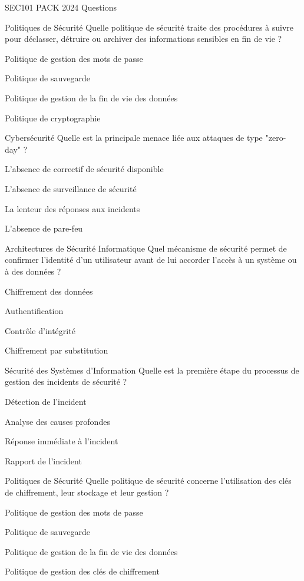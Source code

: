 \documentclass[12pt]{article}
\begin{document}
\begin{quiz}{SEC101 PACK 2024 Questions}
  \begin{multi}[points=1]{Politiques de Sécurité}
    Quelle politique de sécurité traite des procédures à suivre pour déclasser, détruire ou archiver des informations sensibles en fin de vie ?
    \item Politique de gestion des mots de passe
    \item Politique de sauvegarde
    \item* Politique de gestion de la fin de vie des données
    \item Politique de cryptographie
  \end{multi}

  \begin{multi}[points=1]{Cybersécurité}
    Quelle est la principale menace liée aux attaques de type "zero-day" ?
    \item* L'absence de correctif de sécurité disponible
    \item L'absence de surveillance de sécurité
    \item La lenteur des réponses aux incidents
    \item L'absence de pare-feu
  \end{multi}

  \begin{multi}[points=1]{Architectures de Sécurité Informatique}
    Quel mécanisme de sécurité permet de confirmer l'identité d'un utilisateur avant de lui accorder l'accès à un système ou à des données ?
    \item Chiffrement des données
    \item* Authentification
    \item Contrôle d'intégrité
    \item Chiffrement par substitution
  \end{multi}

  \begin{multi}[points=1]{Sécurité des Systèmes d'Information}
    Quelle est la première étape du processus de gestion des incidents de sécurité ?
    \item* Détection de l'incident
    \item Analyse des causes profondes
    \item Réponse immédiate à l'incident
    \item Rapport de l'incident
  \end{multi}

  \begin{multi}[points=1]{Politiques de Sécurité}
    Quelle politique de sécurité concerne l'utilisation des clés de chiffrement, leur stockage et leur gestion ?
    \item Politique de gestion des mots de passe
    \item Politique de sauvegarde
    \item Politique de gestion de la fin de vie des données
    \item* Politique de gestion des clés de chiffrement
  \end{multi}



\end{quiz}
\end{document}
